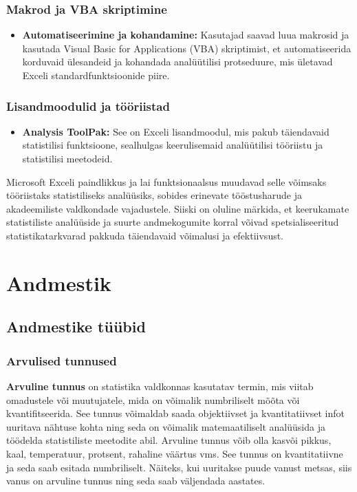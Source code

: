 \documentclass[
]{book}
\providecommand{\tightlist}{%
  \setlength{\itemsep}{0pt}\setlength{\parskip}{0pt}}
\begin{document}
\subsection{Makrod ja VBA skriptimine}\label{makrod-ja-vba-skriptimine}

\begin{itemize}
\tightlist
\item
  \textbf{Automatiseerimine ja kohandamine:} Kasutajad saavad luua makrosid ja kasutada Visual Basic for Applications (VBA) skriptimist, et automatiseerida korduvaid ülesandeid ja kohandada analüütilisi protseduure, mis ületavad Exceli standardfunktsioonide piire.
\end{itemize}

\subsection{Lisandmoodulid ja tööriistad}\label{lisandmoodulid-ja-tuxf6uxf6riistad}

\begin{itemize}
\tightlist
\item
  \textbf{Analysis ToolPak:} See on Exceli lisandmoodul, mis pakub täiendavaid statistilisi funktsioone, sealhulgas keerulisemaid analüütilisi tööriistu ja statistilisi meetodeid.
\end{itemize}

Microsoft Exceli paindlikkus ja lai funktsionaalsus muudavad selle võimsaks tööriistaks statistiliseks analüüsiks, sobides erinevate tööstusharude ja akadeemiliste valdkondade vajadustele. Siiski on oluline märkida, et keerukamate statistiliste analüüside ja suurte andmekogumite korral võivad spetsialiseeritud statistikatarkvarad pakkuda täiendavaid võimalusi ja efektiivsust.

\chapter{Andmestik}\label{andmestik}

\section{Andmestike tüübid}\label{andmestike-tuxfcuxfcbid}

\subsection{Arvulised tunnused}\label{arvulised-tunnused}

\textbf{Arvuline tunnus} on statistika valdkonnas kasutatav termin, mis viitab omadustele või muutujatele, mida on võimalik numbriliselt mõõta või kvantifitseerida. See tunnus võimaldab saada objektiivset ja kvantitatiivset infot uuritava nähtuse kohta ning seda on võimalik matemaatiliselt analüüsida ja töödelda statistiliste meetodite abil. Arvuline tunnus võib olla kasvõi pikkus, kaal, temperatuur, protsent, rahaline väärtus vms. See tunnus on kvantitatiivne ja seda saab esitada numbriliselt. Näiteks, kui uuritakse puude vanust metsas, siis vanus on arvuline tunnus ning seda saab väljendada aastates.
\end{document}
